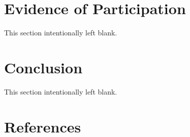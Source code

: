 \documentclass[11pt]{article}
\begin{document}
\section{Evidence of Participation}
This section intentionally left blank.

\section{Conclusion}
This section intentionally left blank.

\section*{References}
\end{document}
